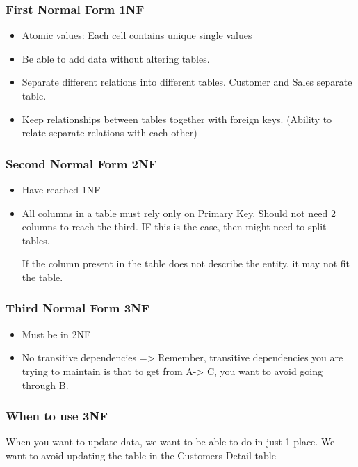 \documentclass[
	paper=a4,%
	pagesize,%
	8pt, fleqn,%
	headings=small,%
	notitlepage,%
	parskip=never]%
	{scrreprt}
\begin{document}
\begin{multicols*}{3}
\subsubsection{First Normal Form 1NF}
\begin{itemize}
\item Atomic values: Each cell contains unique single values
\item Be able to add data without altering tables.
\item Separate different relations into different tables. Customer and Sales separate table.
\item Keep relationships between tables together with foreign keys. (Ability to relate separate relations with each other)

\end{itemize}
\subsubsection{Second Normal Form 2NF}
\begin{itemize}
\item Have reached 1NF
\item All columns in a table must rely only on Primary Key. Should not need 2 columns to reach the third. IF this is the case, then might need to split tables.

If the column present in the table does not describe the entity, it may not fit the table.

\end{itemize}

\subsubsection{Third Normal Form 3NF}
\begin{itemize}
\item Must be in 2NF
\item No transitive dependencies => Remember, transitive dependencies you are trying to maintain is that to get from A-> C, you want to avoid going through B.
\end{itemize}

\subsubsection*{When to use 3NF}
When you want to update data, we want to be able to do in just 1 place. We want to avoid updating the table in the Customers Detail table


\end{multicols*}
\end{document}
